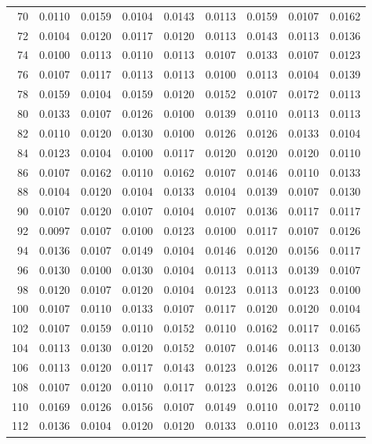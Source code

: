 \documentclass[11pt]{article}
\theoremstyle{definition}
\begin{document}
\begin{table}[ht]
\begin{tabular}{rrrrrrrrr}
  70 & 0.0110 & 0.0159 & 0.0104 & 0.0143 & 0.0113 & 0.0159 & 0.0107 & 0.0162 \\ 
  72 & 0.0104 & 0.0120 & 0.0117 & 0.0120 & 0.0113 & 0.0143 & 0.0113 & 0.0136 \\ 
  74 & 0.0100 & 0.0113 & 0.0110 & 0.0113 & 0.0107 & 0.0133 & 0.0107 & 0.0123 \\ 
  76 & 0.0107 & 0.0117 & 0.0113 & 0.0113 & 0.0100 & 0.0113 & 0.0104 & 0.0139 \\ 
  78 & 0.0159 & 0.0104 & 0.0159 & 0.0120 & 0.0152 & 0.0107 & 0.0172 & 0.0113 \\ 
  80 & 0.0133 & 0.0107 & 0.0126 & 0.0100 & 0.0139 & 0.0110 & 0.0113 & 0.0113 \\ 
  82 & 0.0110 & 0.0120 & 0.0130 & 0.0100 & 0.0126 & 0.0126 & 0.0133 & 0.0104 \\ 
  84 & 0.0123 & 0.0104 & 0.0100 & 0.0117 & 0.0120 & 0.0120 & 0.0120 & 0.0110 \\ 
  86 & 0.0107 & 0.0162 & 0.0110 & 0.0162 & 0.0107 & 0.0146 & 0.0110 & 0.0133 \\ 
  88 & 0.0104 & 0.0120 & 0.0104 & 0.0133 & 0.0104 & 0.0139 & 0.0107 & 0.0130 \\ 
  90 & 0.0107 & 0.0120 & 0.0107 & 0.0104 & 0.0107 & 0.0136 & 0.0117 & 0.0117 \\ 
  92 & 0.0097 & 0.0107 & 0.0100 & 0.0123 & 0.0100 & 0.0117 & 0.0107 & 0.0126 \\ 
  94 & 0.0136 & 0.0107 & 0.0149 & 0.0104 & 0.0146 & 0.0120 & 0.0156 & 0.0117 \\ 
  96 & 0.0130 & 0.0100 & 0.0130 & 0.0104 & 0.0113 & 0.0113 & 0.0139 & 0.0107 \\ 
  98 & 0.0120 & 0.0107 & 0.0120 & 0.0104 & 0.0123 & 0.0113 & 0.0123 & 0.0100 \\ 
  100 & 0.0107 & 0.0110 & 0.0133 & 0.0107 & 0.0117 & 0.0120 & 0.0120 & 0.0104 \\ 
  102 & 0.0107 & 0.0159 & 0.0110 & 0.0152 & 0.0110 & 0.0162 & 0.0117 & 0.0165 \\ 
  104 & 0.0113 & 0.0130 & 0.0120 & 0.0152 & 0.0107 & 0.0146 & 0.0113 & 0.0130 \\ 
  106 & 0.0113 & 0.0120 & 0.0117 & 0.0143 & 0.0123 & 0.0126 & 0.0117 & 0.0123 \\ 
  108 & 0.0107 & 0.0120 & 0.0110 & 0.0117 & 0.0123 & 0.0126 & 0.0110 & 0.0110 \\ 
  110 & 0.0169 & 0.0126 & 0.0156 & 0.0107 & 0.0149 & 0.0110 & 0.0172 & 0.0110 \\ 
  112 & 0.0136 & 0.0104 & 0.0120 & 0.0120 & 0.0133 & 0.0110 & 0.0123 & 0.0113 \\ 

\end{tabular}
\end{table}
\end{document}

